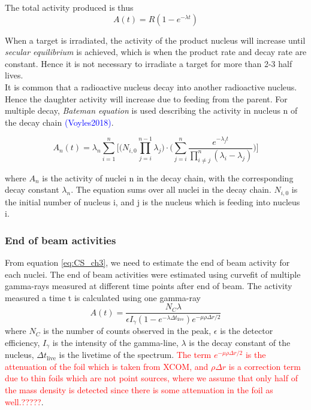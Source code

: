 \documentclass[a4paper,11pt,twoside]{book}
\begin{document}
\noindent The total activity produced is thus 
\begin{equation}
    A(t) = R(1-e^{-\lambda t})
\end{equation}

\noindent When a target is irradiated, the activity of the product nucleus will increase until \textit{secular equilibrium} is achieved, which is when the product rate and decay rate are constant. Hence it is not necessary to irradiate a target for more than 2-3 half lives. \\ 

\noindent It is common that a radioactive nucleus decay into another radioactive nucleus. Hence the daughter activity will increase due to feeding from the parent. For multiple decay, \textit{Bateman equation} is used describing the activity in nucleus n of the decay chain \textcolor{blue}{(Voyles2018)}.

\begin{equation} \label{eq:Bateman}
    A_n(t) = \lambda_n \sum_{i=1}^{n} \Big[ \Big(N_{i,0} \prod_{j=i}^{n-1}\lambda_j\Big) \cdot \Big( \sum_{j=i}^{n}\frac{e^{-\lambda_j t}}{\prod_{i\neq j}^{n}(\lambda_i - \lambda_j) }\Big) \Big]
\end{equation}

\noindent 
where $A_n$ is the activity of nuclei n in the decay chain, with the corresponding decay constant $\lambda_n$. The equation sums over all nuclei in the decay chain. $N_{i,0}$ is the initial number of nucleus i, and j is the nucleus which is feeding into nucleus i.




\subsubsection{End of beam activities}
From equation \ref{eq:CS_ch3}, we need to estimate the end of beam activity for each nuclei. The end of beam activities were estimated using curvefit of multiple gamma-rays measured at different time points after end of beam. The activity measured a time t is calculated using one gamma-ray
\begin{equation} \label{eq:activity_spectra}
    A(t)=\frac{N_C \lambda}{\epsilon I_\gamma (1-e^{-\lambda \Delta t_\text{live}})e^{-\mu\rho\Delta r/2}}
\end{equation}
\noindent
where $N_C$ is the number of counts observed in the peak, $\epsilon$ is the detector efficiency, $I_\gamma$ is the intensity of the gamma-line, $\lambda$ is the decay constant of the nucleus, $\Delta t_\text{live}$ is the livetime of the spectrum. \textcolor{red}{The term $e^{-\mu \rho \Delta r/2}$ is the attenuation of the foil which is taken from \textcolor{red}{XCOM}, and $\rho\Delta r$ is a correction term due to thin foils which are not point sources, where we assume that only half of the mass density is detected since there is some attenuation in the foil as well.?????}.\\
\end{document}
